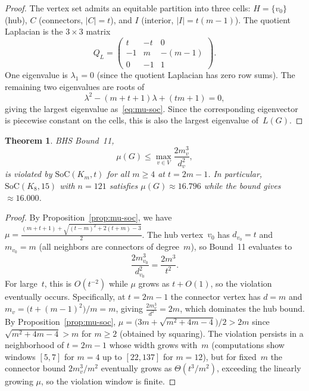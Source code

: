 \documentclass[preprint,12pt]{elsarticle}
\newtheorem{theorem}{Theorem}[section]
\theoremstyle{definition}
\theoremstyle{remark}
\newcommand{\SoC}{\mathrm{SoC}}       %
\newcommand{\Lspec}{\mu}               %
\begin{document}
\begin{proof}
  The vertex set admits an equitable partition into three cells:
  $H = \{v_0\}$ (hub), $C$ (connectors, $|C| = t$), and $I$ (interior,
  $|I| = t(m-1)$). The quotient Laplacian is the $3 \times 3$ matrix
  \begin{equation}\label{eq:quotient-soc}
    Q_L =
    \begin{pmatrix}
      t    & -t     & 0      \\
      -1   & m      & -(m-1) \\
      0    & -1     & 1
    \end{pmatrix}.
  \end{equation}
  One eigenvalue is $\lambda_1 = 0$ (since the quotient Laplacian has zero row sums). The
  remaining two eigenvalues are roots of
  \[
    \lambda^2 - (m + t + 1)\lambda + (tm + 1) = 0,
  \]
  giving the largest eigenvalue as~\eqref{eq:mu-soc}. Since the
  corresponding eigenvector is piecewise constant on the cells,
  this is also the largest eigenvalue of~$L(G)$.
\end{proof}



\begin{theorem}\label{thm:bound11}
  BHS Bound~11,
  \begin{equation}\label{eq:bound11}
    \Lspec(G) \leq \max_{v \in V} \frac{2m_v^3}{d_v^2},
  \end{equation}
  is violated by $\SoC(K_m, t)$ for all $m \geq 4$ at $t = 2m - 1$.
  In particular, $\SoC(K_8, 15)$ with $n = 121$ satisfies
  $\Lspec(G) \approx 16.796$ while the bound gives $\approx 16.000$.
\end{theorem}

\begin{proof}
  By Proposition~\ref{prop:mu-soc}, we have
  $\Lspec = \frac{(m+t+1) + \sqrt{(t-m)^2 + 2(t+m)-3}}{2}$.
  The hub vertex~$v_0$ has $d_{v_0} = t$ and $m_{v_0} = m$ (all
  neighbors are connectors of degree~$m$), so Bound~11 evaluates to
  \[
    \frac{2m_{v_0}^3}{d_{v_0}^2} = \frac{2m^3}{t^2}.
  \]
  For large~$t$, this is $O(t^{-2})$ while $\Lspec$ grows as
  $t + O(1)$, so the violation eventually occurs. Specifically,
  at $t = 2m - 1$ the connector vertex has $d = m$ and
  $m_v = \bigl(t + (m-1)^2\bigr)/m = m$, giving
  $\frac{2m_v^3}{d^2} = 2m$, which dominates the hub bound.
  By Proposition~\ref{prop:mu-soc},
  $\Lspec = \bigl(3m + \sqrt{m^2 + 4m - 4}\bigr)/2 > 2m$
  since $\sqrt{m^2 + 4m - 4} > m$ for $m \geq 2$ (obtained by
  squaring). The violation persists in a neighborhood of $t = 2m - 1$ whose width
  grows with~$m$ (computations show windows $[5,7]$ for $m=4$ up to
  $[22,137]$ for $m=12$), but for fixed~$m$ the connector bound
  $2m_v^3/m^2$ eventually grows as $\Theta(t^3/m^2)$, exceeding
  the linearly growing $\Lspec$, so the violation window is finite.
\end{proof}
\end{document}
